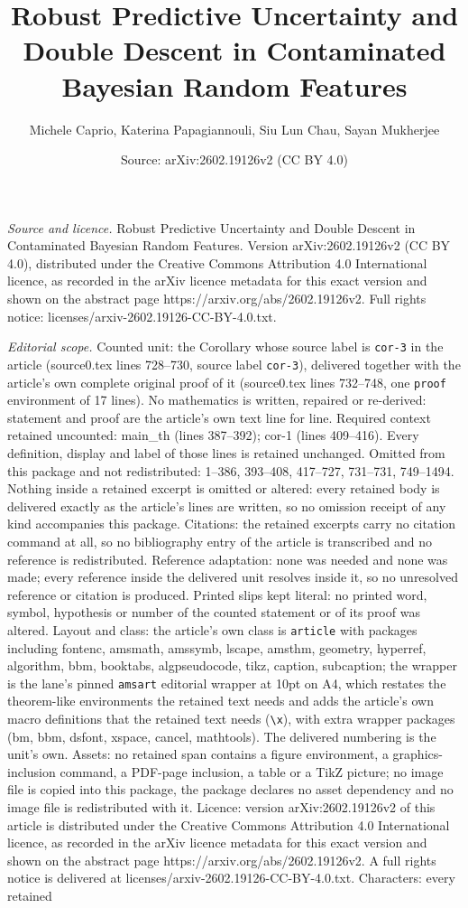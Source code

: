 \documentclass[10pt,a4paper]{amsart}
\title[Robust Predictive Uncertainty and Double Descent in Contamin]{Robust Predictive Uncertainty and Double Descent in Contaminated Bayesian Random Features}
\author{Michele Caprio, Katerina Papagiannouli, Siu Lun Chau, Sayan Mukherjee}
\date{Source: arXiv:2602.19126v2 (CC BY 4.0)}
\begin{document}
\maketitle

\noindent\emph{Source and licence.} Robust Predictive Uncertainty and Double Descent in Contaminated Bayesian Random Features. Version arXiv:2602.19126v2 (CC BY 4.0), distributed under the Creative Commons Attribution 4.0 International licence, as recorded in the arXiv licence metadata for this exact version and shown on the abstract page https://arxiv.org/abs/2602.19126v2. Full rights notice: licenses/arxiv-2602.19126-CC-BY-4.0.txt.\par\smallskip

\noindent\textit{Editorial scope.} Counted unit: the Corollary whose source label is \texttt{cor-3} in the article (source0.tex lines 728--730, source label \texttt{cor-3}), delivered together with the article's own complete original proof of it (source0.tex lines 732--748, one \texttt{proof} environment of 17 lines). No mathematics is written, repaired or re-derived: statement and proof are the article's own text line for line. Required context retained uncounted: main\_th (lines 387--392); cor-1 (lines 409--416). Every definition, display and label of those lines is retained unchanged. Omitted from this package and not redistributed: 1--386, 393--408, 417--727, 731--731, 749--1494. Nothing inside a retained excerpt is omitted or altered: every retained body is delivered exactly as the article's lines are written, so no omission receipt of any kind accompanies this package. Citations: the retained excerpts carry no citation command at all, so no bibliography entry of the article is transcribed and no reference is redistributed. Reference adaptation: none was needed and none was made; every reference inside the delivered unit resolves inside it, so no unresolved reference or citation is produced. Printed slips kept literal: no printed word, symbol, hypothesis or number of the counted statement or of its proof was altered. Layout and class: the article's own class is \texttt{article} with packages including fontenc, amsmath, amssymb, lscape, amsthm, geometry, hyperref, algorithm, bbm, booktabs, algpseudocode, tikz, caption, subcaption; the wrapper is the lane's pinned \texttt{amsart} editorial wrapper at 10pt on A4, which restates the theorem-like environments the retained text needs and adds the article's own macro definitions that the retained text needs (\texttt{\textbackslash x}), with extra wrapper packages (bm, bbm, dsfont, xspace, cancel, mathtools). The delivered numbering is the unit's own. Assets: no retained span contains a figure environment, a graphics-inclusion command, a PDF-page inclusion, a table or a TikZ picture; no image file is copied into this package, the package declares no asset dependency and no image file is redistributed with it. Licence: version arXiv:2602.19126v2 of this article is distributed under the Creative Commons Attribution 4.0 International licence, as recorded in the arXiv licence metadata for this exact version and shown on the abstract page https://arxiv.org/abs/2602.19126v2. A full rights notice is delivered at licenses/arxiv-2602.19126-CC-BY-4.0.txt. Characters: every retained 
\end{document}
